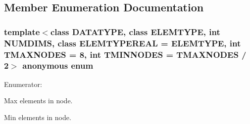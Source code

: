 \subsection{\-Member \-Enumeration \-Documentation}
\hypertarget{class_r_tree_afaccb2e611f17ff46b623771ad7043d7}{\subsubsection[{anonymous enum}]{\setlength{\rightskip}{0pt plus 5cm}template$<$class \-D\-A\-T\-A\-T\-Y\-P\-E, class \-E\-L\-E\-M\-T\-Y\-P\-E, int \-N\-U\-M\-D\-I\-M\-S, class \-E\-L\-E\-M\-T\-Y\-P\-E\-R\-E\-A\-L = \-E\-L\-E\-M\-T\-Y\-P\-E, int \-T\-M\-A\-X\-N\-O\-D\-E\-S = 8, int \-T\-M\-I\-N\-N\-O\-D\-E\-S = \-T\-M\-A\-X\-N\-O\-D\-E\-S / 2$>$ anonymous enum}}\label{class_r_tree_afaccb2e611f17ff46b623771ad7043d7}
\begin{Desc}
\item[\-Enumerator\-: ]\par
\begin{description}
\item[{\em 
\hypertarget{class_r_tree_afaccb2e611f17ff46b623771ad7043d7ac05afe446df73fa67991e5199453a37f}{\-M\-A\-X\-N\-O\-D\-E\-S}\label{class_r_tree_afaccb2e611f17ff46b623771ad7043d7ac05afe446df73fa67991e5199453a37f}
}]\-Max elements in node. \item[{\em 
\hypertarget{class_r_tree_afaccb2e611f17ff46b623771ad7043d7a3be3d8c82fd5bfbd5e5a496e9877d71a}{\-M\-I\-N\-N\-O\-D\-E\-S}\label{class_r_tree_afaccb2e611f17ff46b623771ad7043d7a3be3d8c82fd5bfbd5e5a496e9877d71a}
}]\-Min elements in node. \end{description}
\end{Desc}



